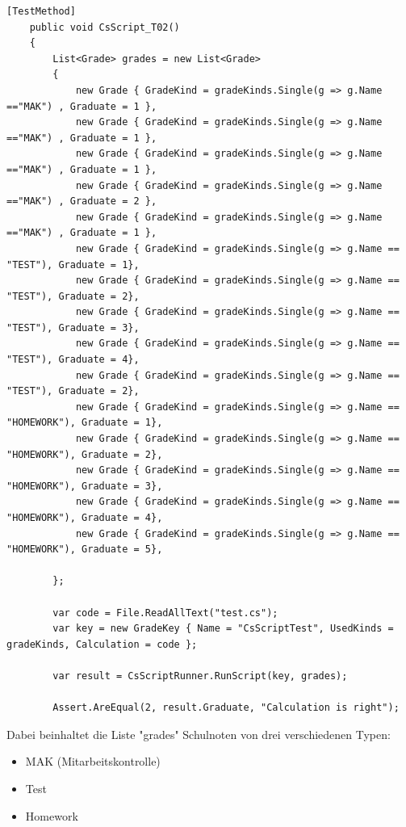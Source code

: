 \begin{lstlisting}[language={[Sharp]C},caption=Test for CsharpScripting,label=lst:impl:csc]
[TestMethod]
    public void CsScript_T02()
    {
        List<Grade> grades = new List<Grade>
        {
            new Grade { GradeKind = gradeKinds.Single(g => g.Name =="MAK") , Graduate = 1 },
            new Grade { GradeKind = gradeKinds.Single(g => g.Name =="MAK") , Graduate = 1 },
            new Grade { GradeKind = gradeKinds.Single(g => g.Name =="MAK") , Graduate = 1 },
            new Grade { GradeKind = gradeKinds.Single(g => g.Name =="MAK") , Graduate = 2 },
            new Grade { GradeKind = gradeKinds.Single(g => g.Name =="MAK") , Graduate = 1 },
            new Grade { GradeKind = gradeKinds.Single(g => g.Name == "TEST"), Graduate = 1},
            new Grade { GradeKind = gradeKinds.Single(g => g.Name == "TEST"), Graduate = 2},
            new Grade { GradeKind = gradeKinds.Single(g => g.Name == "TEST"), Graduate = 3},
            new Grade { GradeKind = gradeKinds.Single(g => g.Name == "TEST"), Graduate = 4},
            new Grade { GradeKind = gradeKinds.Single(g => g.Name == "TEST"), Graduate = 2},
            new Grade { GradeKind = gradeKinds.Single(g => g.Name == "HOMEWORK"), Graduate = 1},
            new Grade { GradeKind = gradeKinds.Single(g => g.Name == "HOMEWORK"), Graduate = 2},
            new Grade { GradeKind = gradeKinds.Single(g => g.Name == "HOMEWORK"), Graduate = 3},
            new Grade { GradeKind = gradeKinds.Single(g => g.Name == "HOMEWORK"), Graduate = 4},
            new Grade { GradeKind = gradeKinds.Single(g => g.Name == "HOMEWORK"), Graduate = 5},

        };

        var code = File.ReadAllText("test.cs");
        var key = new GradeKey { Name = "CsScriptTest", UsedKinds = gradeKinds, Calculation = code };

        var result = CsScriptRunner.RunScript(key, grades);

        Assert.AreEqual(2, result.Graduate, "Calculation is right");
\end{lstlisting}

Dabei beinhaltet die Liste "grades" Schulnoten von drei verschiedenen Typen:
\begin{itemize}
    \item MAK (Mitarbeitskontrolle)
    \item Test
    \item Homework
\end{itemize}


